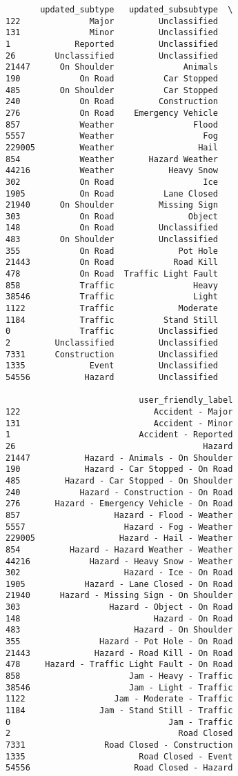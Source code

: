 \documentclass[
  letterpaper,
  DIV=11,
  numbers=noendperiod]{scrartcl}
\begin{document}
\begin{verbatim}
       updated_subtype   updated_subsubtype  \
122              Major         Unclassified   
131              Minor         Unclassified   
1             Reported         Unclassified   
26        Unclassified         Unclassified   
21447      On Shoulder              Animals   
190            On Road          Car Stopped   
485        On Shoulder          Car Stopped   
240            On Road         Construction   
276            On Road    Emergency Vehicle   
857            Weather                Flood   
5557           Weather                  Fog   
229005         Weather                 Hail   
854            Weather       Hazard Weather   
44216          Weather           Heavy Snow   
302            On Road                  Ice   
1905           On Road          Lane Closed   
21940      On Shoulder         Missing Sign   
303            On Road               Object   
148            On Road         Unclassified   
483        On Shoulder         Unclassified   
355            On Road             Pot Hole   
21443          On Road            Road Kill   
478            On Road  Traffic Light Fault   
858            Traffic                Heavy   
38546          Traffic                Light   
1122           Traffic             Moderate   
1184           Traffic          Stand Still   
0              Traffic         Unclassified   
2         Unclassified         Unclassified   
7331      Construction         Unclassified   
1335             Event         Unclassified   
54556           Hazard         Unclassified   

                           user_friendly_label  
122                           Accident - Major  
131                           Accident - Minor  
1                          Accident - Reported  
26                                      Hazard  
21447           Hazard - Animals - On Shoulder  
190             Hazard - Car Stopped - On Road  
485         Hazard - Car Stopped - On Shoulder  
240            Hazard - Construction - On Road  
276       Hazard - Emergency Vehicle - On Road  
857                   Hazard - Flood - Weather  
5557                    Hazard - Fog - Weather  
229005                 Hazard - Hail - Weather  
854          Hazard - Hazard Weather - Weather  
44216            Hazard - Heavy Snow - Weather  
302                     Hazard - Ice - On Road  
1905            Hazard - Lane Closed - On Road  
21940      Hazard - Missing Sign - On Shoulder  
303                  Hazard - Object - On Road  
148                           Hazard - On Road  
483                       Hazard - On Shoulder  
355                Hazard - Pot Hole - On Road  
21443             Hazard - Road Kill - On Road  
478     Hazard - Traffic Light Fault - On Road  
858                      Jam - Heavy - Traffic  
38546                    Jam - Light - Traffic  
1122                  Jam - Moderate - Traffic  
1184               Jam - Stand Still - Traffic  
0                                Jam - Traffic  
2                                  Road Closed  
7331                Road Closed - Construction  
1335                       Road Closed - Event  
54556                     Road Closed - Hazard  
\end{verbatim}
\end{document}
